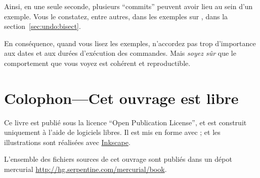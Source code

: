 Ainsi, en une seule seconde, plusieurs ``commits'' peuvent avoir lieu
au sein d'un exemple. Vous le constatez, entre autres, dans les 
exemples sur , dans la section~\ref{sec:undo:bisect}.

En conséquence, quand vous lisez les exemples, n'accordez pas trop
d'importance aux dates et aux durées d'exécution des commandes. Mais
\emph{soyez sûr} que le comportement que vous voyez est cohérent et
reproductible.

\section{Colophon---Cet ouvrage est libre}

Ce livre est publié sous la licence ``Open Publication License'', et
est construit uniquement à l'aide de logiciels libres. Il est mis
en forme avec \LaTex{}; et les illustrations sont réalisées avec 
\href{http://www.inkscape.org/}{Inkscape}.

L'ensemble des fichiers sources de cet ouvrage sont publiés dans un
dépot mercurial  \url{http://hg.serpentine.com/mercurial/book}.

